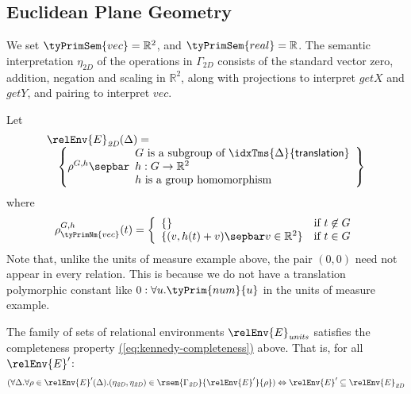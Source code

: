 \subsection{Euclidean Plane Geometry}\label{sec:2d-semantics}

We set $\tyPrimSem{vec} = \mathbb{R}^2$, and $\tyPrimSem{real} =
\mathbb{R}$. The semantic interpretation $\eta_{\mathit{2D}}$ of the
operations in $\Gamma_{\mathit{2D}}$ consists of the standard vector
zero, addition, negation and scaling in $\mathbb{R}^2$, along with
projections to interpret $\mathit{getX}$ and $\mathit{getY}$, and
pairing to interpret $\mathit{vec}$.

Let
\begin{displaymath}
  \begin{array}{l}
    \relEnv{E}_{\mathit{2D}}(\Delta) = \\
    \quad\left\{ \rho^{G,h} \sepbar
      \begin{array}{l}
        G\textrm{ is a subgroup of }\idxTms{\Delta}{\mathsf{translation}} \\
        h : G \to \mathbb{R}^2 \\
        h\textrm{ is a group homomorphism}
      \end{array}
    \right\}
  \end{array}
\end{displaymath}
where
\begin{displaymath}
  \rho^{G,h}_{\tyPrimNm{vec}}(t) = \left\{
    \begin{array}{ll}
      \{\} & \textrm{if }t \not\in G \\
      \{(v,h(t) + v) \sepbar v \in \mathbb{R}^2 \} & \textrm{if }t \in G
    \end{array}
  \right.
\end{displaymath}
Note that, unlike the units of measure example above, the pair $(0,0)$
need not appear in every relation. This is because we do not have a
translation polymorphic constant like $0 : \forall u. \tyPrim{num}{u}$
in the units of measure example.

\begin{theorem}
  The family of sets of relational environments
  $\relEnv{E}_{\mathit{units}}$ satisfies the completeness property
  \hyperref[eq:kennedy-completeness]{(\ref*{eq:kennedy-completeness})}
  above. That is, for all $\relEnv{E}'$:
  \begin{displaymath}
    (\forall \Delta.\forall \rho \in \relEnv{E}'(\Delta). (\eta_{\mathit{2D}}, \eta_{\mathit{2D}}) \in \rsem{\Gamma_{\mathit{2D}}}{\relEnv{E}'}{\rho}) \Leftrightarrow \relEnv{E}'\subseteq \relEnv{E}_{\mathit{2D}}
  \end{displaymath}
\end{theorem}

